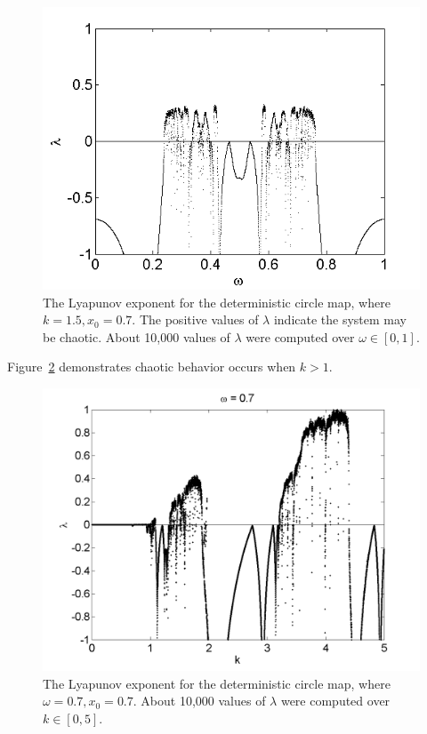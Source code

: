 \begin{figure}[!h]
\caption[Lyapunov exponent in the deterministic circle map, varying $\omega$]{The
  Lyapunov exponent for the deterministic
  circle map, where $k=1.5,x_0=0.7$. The positive values of $\lambda$
  indicate the system may be chaotic. About 10,000 values of $\lambda$
were computed over $\omega \in [0,1]$.}\label{fig:detcirclyap}
	\begin{center}
		\includegraphics[scale=0.55]{figs/det_circ_lyap.png}
	\end{center}
\end{figure} 
Figure~\ref{fig:detcirclyapk} demonstrates chaotic behavior occurs
when $k > 1$.
\begin{figure}[!h]
\caption[Lyapunov exponent in the deterministic circle map, varying $k$]{The
  Lyapunov exponent for the deterministic
  circle map, where $\omega=0.7,x_0=0.7$. About 10,000 values of $\lambda$
were computed over $k \in [0,5]$.}\label{fig:detcirclyapk}
	\begin{center}
		\includegraphics[scale=0.45]{figs/det_circ_lyap_k.png}
	\end{center}
\end{figure} 
